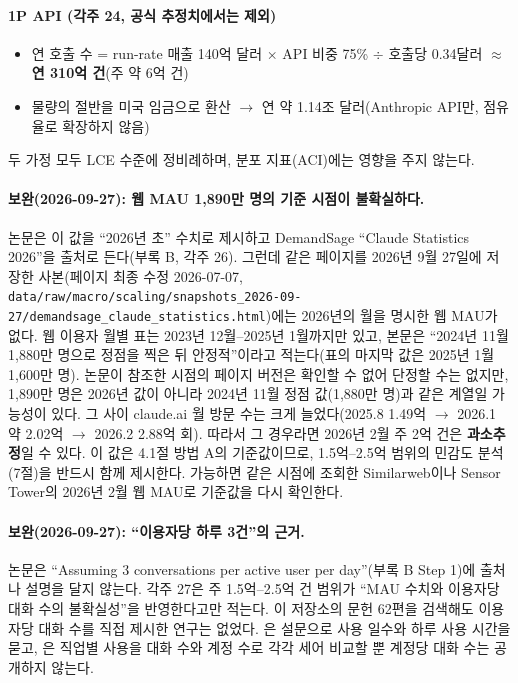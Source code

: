 \documentclass[11pt]{article}
\begin{document}
\paragraph{1P API (각주 24, 공식 추정치에서는 제외)}
\begin{itemize}
  \item 연 호출 수 = run-rate 매출 140억 달러 $\times$ API 비중 75\% $\div$ 호출당 0.34달러 $\approx$ \textbf{연 310억 건}(주 약 6억 건)
  \item 물량의 절반을 미국 임금으로 환산 $\to$ 연 약 1.14조 달러(Anthropic API만, 점유율로 확장하지 않음)
\end{itemize}

두 가정 모두 LCE 수준에 정비례하며, 분포 지표(ACI)에는 영향을 주지 않는다.

\paragraph{보완(2026-09-27): 웹 MAU 1,890만 명의 기준 시점이 불확실하다.} 논문은 이 값을 ``2026년 초'' 수치로 제시하고 DemandSage ``Claude Statistics 2026''을 출처로 든다(부록 B, 각주 26). 그런데 같은 페이지를 2026년 9월 27일에 저장한 사본(페이지 최종 수정 2026-07-07, \texttt{data/raw/macro/scaling/snapshots\_2026-09-27/demandsage\_claude\_statistics.html})에는 2026년의 월을 명시한 웹 MAU가 없다. 웹 이용자 월별 표는 2023년 12월--2025년 1월까지만 있고, 본문은 ``2024년 11월 1,880만 명으로 정점을 찍은 뒤 안정적''이라고 적는다(표의 마지막 값은 2025년 1월 1,600만 명). 논문이 참조한 시점의 페이지 버전은 확인할 수 없어 단정할 수는 없지만, 1,890만 명은 2026년 값이 아니라 2024년 11월 정점 값(1,880만 명)과 같은 계열일 가능성이 있다. 그 사이 claude.ai 월 방문 수는 크게 늘었다(2025.8 1.49억 $\to$ 2026.1 약 2.02억 $\to$ 2026.2 2.88억 회). 따라서 그 경우라면 2026년 2월 주 2억 건은 \textbf{과소추정}일 수 있다. 이 값은 4.1절 방법 A의 기준값이므로, 1.5억--2.5억 범위의 민감도 분석(7절)을 반드시 함께 제시한다. 가능하면 같은 시점에 조회한 Similarweb이나 Sensor Tower의 2026년 2월 웹 MAU로 기준값을 다시 확인한다.

\paragraph{보완(2026-09-27): ``이용자당 하루 3건''의 근거.} 논문은 ``Assuming 3 conversations per active user per day''(부록 B Step 1)에 출처나 설명을 달지 않는다. 각주 27은 주 1.5억--2.5억 건 범위가 ``MAU 수치와 이용자당 대화 수의 불확실성''을 반영한다고만 적는다. 이 저장소의 문헌 62편을 검색해도 이용자당 대화 수를 직접 제시한 연구는 없었다. \textcite{bick-2026-mind-the-gap-ai-adoption}은 설문으로 사용 일수와 하루 사용 시간을 묻고, \textcite{handa-2025-which-economic-tasks-are}은 직업별 사용을 대화 수와 계정 수로 각각 세어 비교할 뿐 계정당 대화 수는 공개하지 않는다.
\end{document}

